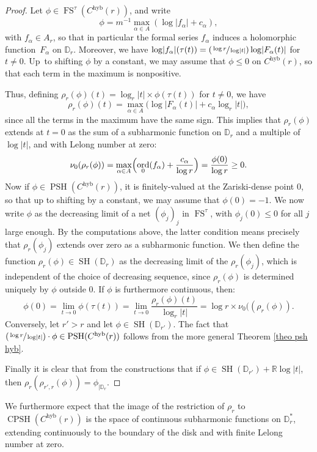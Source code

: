 \documentclass[JEP,XML,SOM,Unicode,published]{cedram}
\newcommand{\Psfrac}[2]{(\sfrac{#1}{#2})}
\theoremstyle{definition}
\newcommand \D {\mathbb{D}}
\newcommand \R{\mathbb R}
\DeclareMathOperator{\CPSH}{CPSH}
\DeclareMathOperator{\FS}{FS}
\newcommand{\hyb}{\mathrm{hyb}}
\DeclareMathOperator{\ord}{ord}
\DeclareMathOperator{\PSH}{PSH}
\DeclareMathOperator{\SH}{SH}
\begin{document}
\begin{proof}
Let $\phi \in \FS^{\tau} (C^{\hyb}(r))$, and write
\[
\phi = m^{-1} \max_{\alpha \in A} (\log \lvert f_{\alpha} \rvert + c_{\alpha}),
\]
with $f_{\alpha} \in A_r$, so that in particular the formal series $f_{\alpha}$ induces a holomorphic function~$F_{\alpha}$ on $\D_r$. Moreover, we have $\log \lvert f_{\alpha} \rvert (\tau(t)) = \Psfrac{\log r}{\log \lvert t \rvert} \log \lvert F_{\alpha}(t) \rvert$ for $t \neq 0$. Up~to shifting $\phi$ by a constant, we may assume that $\phi \le 0$ on $C^{\hyb}(r)$, so that each term in the maximum is nonpositive.

Thus, defining $\rho_r(\phi) (t) = \log_r \lvert t \rvert \times \phi(\tau(t))$ for $t \neq 0$, we have
\[
\rho_r(\phi) (t) = \max_{\alpha \in A} \bigl(\log \lvert F_{\alpha}(t) \rvert + c_{\alpha}\log_r \lvert t \rvert \bigr),
\]
since all the terms in the maximum have the same sign. This implies that $\rho_r(\phi)$ extends at $t=0$ as the sum of a subharmonic function on $\D_r$ and a multiple of $\log \lvert t \rvert$, and with Lelong number at zero:
\[
\nu_0(\rho_r(\phi)) = \max_{\alpha \in A} \Bigl(\ord_0(f_{\alpha}) + \frac{c_{\alpha}}{\log r}\Bigr) = \frac{ \phi(0)}{\log r} \ge 0.
\]
Now if $\phi \in \PSH(C^{\hyb}(r))$, it is finitely-valued at the Zariski-dense point $0$, so that up to shifting by a constant, we may assume that $\phi(0) =-1$. We now write $\phi$ as the decreasing limit of a net $(\phi_j)_j$ in $\FS^{\tau}$, with $\phi_j(0) \le 0$ for all $j$ large enough. By the computations above, the latter condition means precisely that $\rho_r(\phi_j)$ extends over zero as a subharmonic function. We then define the function $\rho_r(\phi) \in \SH(\D_r)$ as the decreasing limit of the $\rho_r(\phi_j)$, which is independent of the choice of decreasing sequence, since $\rho_r(\phi)$ is determined uniquely by $\phi$ outside $0$. If $\phi$ is furthermore continuous, then:
\[
\phi(0) = \lim_{t \to 0} \phi(\tau(t)) = \lim_{t \to 0} \frac{\rho_r(\phi)(t)}{\log_r \lvert t \rvert} = \log r \times \nu_0((\rho_r(\phi)).
\]
Conversely, let $r'>r$ and let $\phi \in \SH(\D_{r'})$. The fact that $\Psfrac{\log r}{\log \lvert t \rvert} \cdot \phi \in \PSH(C^{\hyb}(r))$ follows from the more general Theorem \ref{theo psh hyb}.

Finally it is clear that from the constructions that if $\phi \in \SH(\D_{r'}) + \R \log \lvert t \rvert$, then $\rho_r(\rho_{r', r}(\phi))= \phi_{| \D_r}$.
\end{proof}
We furthermore expect that the image of the restriction of $\rho_r$ to $\CPSH(C^{\hyb}(r))$ is the space of continuous subharmonic functions on $\D^*_r$, extending continuously to the boundary of the disk and with finite Lelong number at zero.
\end{document}
